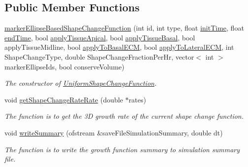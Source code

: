 \subsection*{Public Member Functions}
\begin{DoxyCompactItemize}
\item 
\hyperlink{classmarkerEllipseBasedShapeChangeFunction_a194f0e273b24c79645705daa589b0960}{marker\+Ellipse\+Based\+Shape\+Change\+Function} (int id, int type, float \hyperlink{classGrowthFunctionBase_ae92513a7b41637df8e26e7db35ddf97c}{init\+Time}, float \hyperlink{classGrowthFunctionBase_a3ff4db0573d354a75666a5f3ca446941}{end\+Time}, bool \hyperlink{classGrowthFunctionBase_a254c82be25d3648a0474c24a63d5a555}{apply\+Tissue\+Apical}, bool \hyperlink{classGrowthFunctionBase_afcbfd4691a386ba9dbf75888e0a4ef9e}{apply\+Tissue\+Basal}, bool apply\+Tissue\+Midline, bool \hyperlink{classGrowthFunctionBase_a9fe46fc6dde4041b79204beb48972a09}{apply\+To\+Basal\+E\+C\+M}, bool \hyperlink{classGrowthFunctionBase_ac623b1dbe376bce5dddbe1a2e21c776f}{apply\+To\+Lateral\+E\+C\+M}, int Shape\+Change\+Type, double Shape\+Change\+Fraction\+Per\+Hr, vector$<$ int $>$ marker\+Ellipse\+Ids, bool conserve\+Volume)
\begin{DoxyCompactList}\small\item\em The constructor of \hyperlink{classUniformShapeChangeFunction}{Uniform\+Shape\+Change\+Function}. \end{DoxyCompactList}\item 
void \hyperlink{classmarkerEllipseBasedShapeChangeFunction_a0df657d2635e1826f23b4e3a7e327bbd}{get\+Shape\+Change\+Rate\+Rate} (double $\ast$rates)
\begin{DoxyCompactList}\small\item\em The function is to get the 3\+D growth rate of the current shape change function. \end{DoxyCompactList}\item 
void \hyperlink{classmarkerEllipseBasedShapeChangeFunction_a6fd27b26a930edad363aaee898c432e5}{write\+Summary} (ofstream \&save\+File\+Simulation\+Summary, double dt)
\begin{DoxyCompactList}\small\item\em The function is to write the growth function summary to simulation summary file. \end{DoxyCompactList}\end{DoxyCompactItemize}
